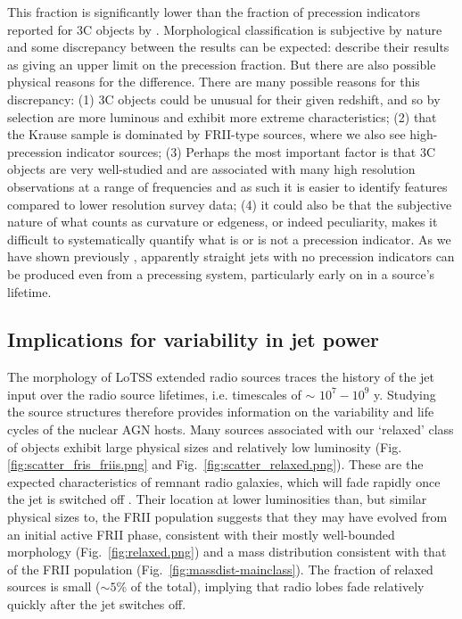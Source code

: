 \documentclass{aa}
\begin{document}
This fraction is significantly lower than the fraction of precession indicators reported for 3C objects by \cite{krause18}. Morphological classification is subjective by nature and some discrepancy between the results can be expected: \cite{krause18} describe their results as giving an upper limit on the precession fraction. But there are also possible physical reasons for the difference. There are many possible reasons for this discrepancy: (1) 3C objects could be unusual for their given redshift, and so by selection are more luminous and exhibit more extreme characteristics; (2) that the Krause sample is dominated by FRII-type sources, where we also see high-precession indicator sources; (3) Perhaps the most important factor is that 3C objects are very well-studied and are associated with many high resolution observations at a range of frequencies and as such it is easier to identify features compared to lower resolution survey data; (4) it could also be that the subjective nature of what counts as curvature or edgeness, or indeed peculiarity, makes it difficult to systematically quantify what is or is not a precession indicator. As we have shown previously \citep{horton20b}, apparently straight jets with no precession indicators can be produced even from a precessing system, particularly early on in a source's lifetime.

\subsection{Implications for variability in jet power} 

The morphology of LoTSS extended radio sources traces the history of the jet input over the radio source lifetimes, i.e. timescales of  $\sim$ $10^7 -10^9$ y. Studying the source structures therefore provides information on the variability and life cycles of the nuclear AGN hosts. Many sources associated with our `relaxed' class of objects exhibit large physical sizes and relatively low luminosity (Fig. \ref{fig:scatter_fris_friis.png} and Fig.\ \ref{fig:scatter_relaxed.png}). These are the expected characteristics of remnant radio galaxies, which will fade rapidly once the jet is switched off \citep{slee01,hardcastle18,mahatma18,jurlin21,mostert23}. Their location at lower luminosities than, but similar physical sizes to, the FRII population suggests that they may have evolved from an initial active FRII phase, consistent with their mostly well-bounded morphology (Fig.\ \ref{fig:relaxed.png}) and a mass distribution consistent with that of the FRII population (Fig.\ \ref{fig:massdist-mainclass}).  The fraction of relaxed sources is small ($\sim 5$\% of the total), implying that radio lobes fade relatively quickly after the jet switches off.
\end{document}
